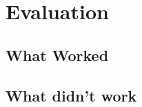 \section{Evaluation}\label{sec:evaluation}

\subsection{What Worked}

\subsection{What didn’t work}
